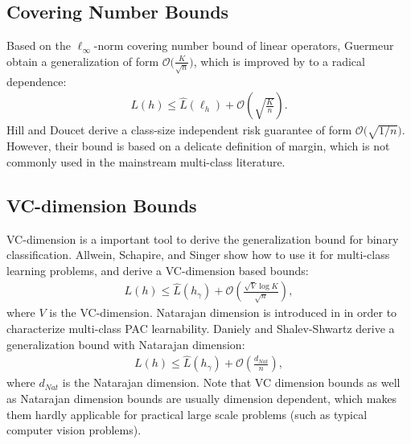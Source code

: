 \documentclass{article}
\begin{document}
\subsection{Covering Number Bounds}
Based on the $\ell_\infty$-norm covering number bound of
linear operators, Guermeur  obtain
a generalization of form $\mathcal{O}\big(\frac{K}{\sqrt{n}}\big)$,
which is improved by \cite{zhang2004statistical} to a radical dependence:
  \begin{align*}
   L(h)\leq  \hat{L}(\ell_h) +\mathcal{O}\left(\sqrt{\frac{K}{n}}\right).
\end{align*}
Hill and Doucet  derive a class-size independent risk guarantee
of form $\mathcal{O}\big(\sqrt{{1}/{n}}\big)$.
However, their bound is based on a delicate definition of margin,
which is not commonly  used in the mainstream multi-class literature.

\subsection{VC-dimension Bounds}
VC-dimension is a important tool to derive the generalization bound for binary classification.
Allwein, Schapire, and Singer  show how to use it
for multi-class learning problems,
and derive a VC-dimension based bounds:
\begin{align*}
   L(h)\leq  \hat{L}(h_\gamma) +\mathcal{O}\left(\frac{\sqrt{V}\log K}{\sqrt{n}}\right),
\end{align*}
where $V$ is the VC-dimension.
Natarajan dimension is introduced in \cite{Natarajan1989} in
order to characterize multi-class PAC learnability.
Daniely and Shalev-Shwartz  derive a generalization bound with Natarajan dimension:
\begin{align*}
   L(h)\leq  \hat{L}(h_\gamma) +\mathcal{O}\left(\frac{d_{Nat}}{n}\right),
\end{align*}
where $d_{Nat}$ is the Natarajan dimension.
Note that VC dimension bounds as well as Natarajan dimension bounds are usually dimension
dependent, which makes them hardly applicable for practical large
scale problems (such as typical computer vision problems).
\end{document}
